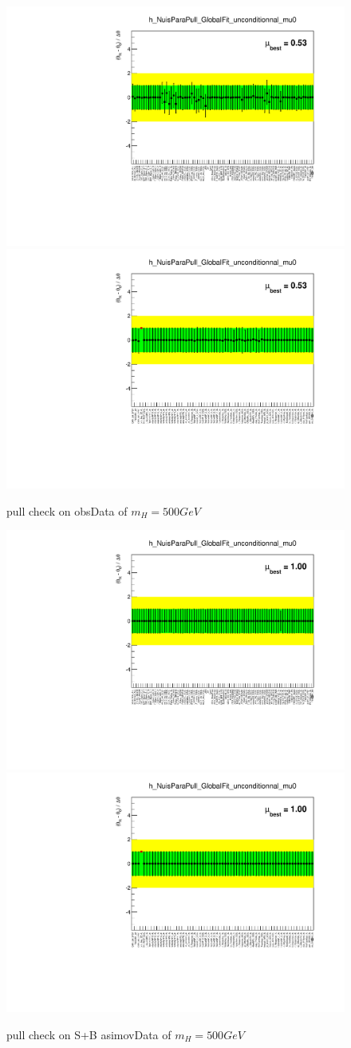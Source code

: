 \begin{figure}
\includegraphics[width=.45\textwidth, angle=-90]{fig/Statistical/combination/pull-obs-combined-mH500_1.pdf}
\includegraphics[width=.45\textwidth, angle=-90]{fig/Statistical/combination/pull-obs-combined-mH500_2.pdf}
\caption{pull check on obsData of $m_{H}=500 GeV$}
\label{fig:pull-obs-comb-500}
\end{figure}

\begin{figure}
\includegraphics[width=.4\textwidth, angle=-90]{fig/Statistical/combination/pull-exp-combined-mH500_1_mu1.pdf}
\includegraphics[width=.4\textwidth, angle=-90]{fig/Statistical/combination/pull-exp-combined-mH500_2_mu1.pdf}
\caption{pull check on S+B asimovData of $m_{H}=500 GeV$}
\label{fig:pull-exp-comb-500_mu1}
\end{figure}

